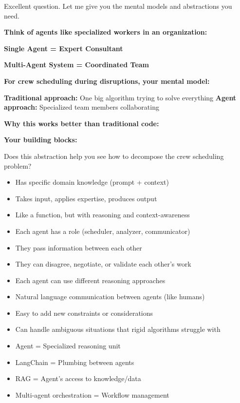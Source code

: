 \begin{botresponse}
Excellent question. Let me give you the mental models and abstractions you need.

\textbf{Think of agents like specialized workers in an organization:}

\textbf{Single Agent = Expert Consultant}

\textbf{Multi-Agent System = Coordinated Team}

\textbf{For crew scheduling during disruptions, your mental model:}

\textbf{Traditional approach:} One big algorithm trying to solve everything \textbf{Agent approach:} Specialized team members collaborating

\textbf{Why this works better than traditional code:}

\textbf{Your building blocks:}

Does this abstraction help you see how to decompose the crew scheduling problem?

\begin{itemize}
\item Has specific domain knowledge (prompt + context)
\item Takes input, applies expertise, produces output
\item Like a function, but with reasoning and context-awareness
\end{itemize}

\begin{itemize}
\item Each agent has a role (scheduler, analyzer, communicator)
\item They pass information between each other
\item They can disagree, negotiate, or validate each other's work
\end{itemize}

\begin{itemize}
\item Each agent can use different reasoning approaches
\item Natural language communication between agents (like humans)
\item Easy to add new constraints or considerations
\item Can handle ambiguous situations that rigid algorithms struggle with
\end{itemize}

\begin{itemize}
\item Agent = Specialized reasoning unit
\item LangChain = Plumbing between agents
\item RAG = Agent's access to knowledge/data
\item Multi-agent orchestration = Workflow management
\end{itemize}
\end{botresponse}

